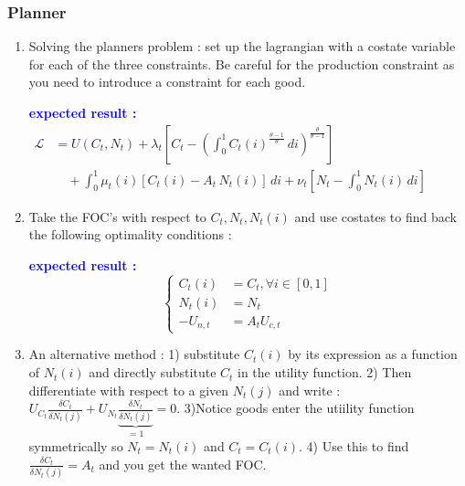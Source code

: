 \documentclass{article}
\begin{document}
\subsubsection{Planner}
\begin{enumerate}
    \item Solving the planners problem : set up the lagrangian with a costate variable for each of the three constraints. Be careful for the production constraint as you need to introduce a constraint for each good.
    \begin{expectedresultsbox}
        \textcolor{blue}{\textbf{expected result : }}  $\begin{aligned}\mathcal{L} &= U(C_t, N_t) + \lambda_t \left[ C_t - \left(\int_0^1 C_t(i)^{\frac{\theta-1}{\theta}}\, di \right)^{\frac{\theta}{\theta-1}} \right] \ \\[1em]&\quad+ \int_0^1 \mu_t(i) \left[ C_t(i) - A_t\, N_t(i) \right]\, di  + \nu_t \left[ N_t - \int_0^1 N_t(i)\, di \right]\end{aligned}$ 
    \end{expectedresultsbox}
    \item Take the FOC's with respect to $C_t, N_t, N_t(i)$ and use costates to find back the following optimality conditions : 
    \begin{expectedresultsbox}
         \textcolor{blue}{\textbf{expected result : }} \begin{equation}
        \left\{
        \begin{aligned}
            C_t(i)&=C_t, \forall i\in[0,1]\\
            N_t(i) &= N_t\\
            -U_{n,t}&=A_tU_{c,t}
        \end{aligned}   
        \right.
        \end{equation}
    \end{expectedresultsbox}
    \item An alternative method : 1) substitute $C_t(i)$ by its expression as a function of $N_t(i)$ and directly substitute $C_t$ in the utility function. 2) Then differentiate with respect to a given $N_t(j)$ and write : $U_{C_t}\frac{\delta C_t}{\delta N_t(j)} + U_{N_t}\underbrace{\frac{\delta N_t}{\delta N_t(j)}}_{=1}= 0$. 3)Notice goods enter the utiility function symmetrically so $N_t = N_t(i)$ and $C_t=C_t(i)$. 4) Use this to find $\frac{\delta C_t}{\delta N_t(j)}=A_t$ and you get the wanted FOC.
\end{enumerate}
\end{document}
